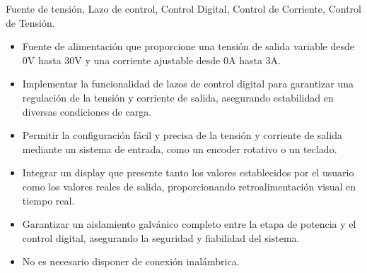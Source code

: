 \begin{resumen}{Fuente de tensión, Lazo de control, Control Digital, Control de Corriente, Control de Tensión.}
\begin{itemize}
    \item Fuente de alimentación que proporcione una tensión de salida variable desde 0V hasta 30V y una corriente ajustable desde 0A hasta 3A.
    \item Implementar la funcionalidad de lazos de control digital para garantizar una regulación de la tensión y corriente de salida, asegurando estabilidad en diversas condiciones de carga.
    \item Permitir la configuración fácil y precisa de la tensión y corriente de salida mediante un sistema de entrada, como un encoder rotativo o un teclado.
    \item Integrar un display que presente tanto los valores establecidos por el usuario como los valores reales de salida, proporcionando retroalimentación visual en tiempo real.
    \item Garantizar un aislamiento galvánico completo entre la etapa de potencia y el control digital, asegurando la seguridad y fiabilidad del sistema.
    \item No es necesario disponer de conexión inalámbrica.
\end{itemize}

\end{resumen}
